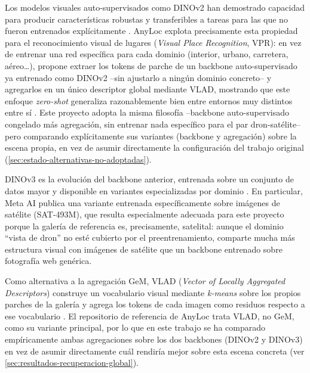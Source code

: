 Los modelos visuales auto-supervisados como DINOv2 han demostrado capacidad para producir características robustas y transferibles a tareas para las que no fueron entrenados explícitamente \parencite{oquab2023dinov2}. AnyLoc explota precisamente esta propiedad para el reconocimiento visual de lugares (\textit{Visual Place Recognition}, VPR): en vez de entrenar una red específica para cada dominio (interior, urbano, carretera, aéreo\ldots), propone extraer los tokens de parche de un backbone auto-supervisado ya entrenado como DINOv2 --sin ajustarlo a ningún dominio concreto-- y agregarlos en un único descriptor global mediante VLAD, mostrando que este enfoque \textit{zero-shot} generaliza razonablemente bien entre entornos muy distintos entre sí \parencite{keetha2023anyloc}. Este proyecto adopta la misma filosofía --backbone auto-supervisado congelado más agregación, sin entrenar nada específico para el par dron-satélite-- pero comparando explícitamente sus variantes (backbone y agregación) sobre la escena propia, en vez de asumir directamente la configuración del trabajo original (\autoref{sec:estado-alternativas-no-adoptadas}).

DINOv3 es la evolución del backbone anterior, entrenada sobre un conjunto de datos mayor y disponible en variantes especializadas por dominio \parencite{simeoni2025dinov3}. En particular, Meta AI publica una variante entrenada específicamente sobre imágenes de satélite (SAT-493M), que resulta especialmente adecuada para este proyecto porque la galería de referencia es, precisamente, satelital: aunque el dominio \enquote{vista de dron} no esté cubierto por el preentrenamiento, comparte mucha más estructura visual con imágenes de satélite que un backbone entrenado sobre fotografía web genérica.

Como alternativa a la agregación GeM, VLAD (\textit{Vector of Locally Aggregated Descriptors}) construye un vocabulario visual mediante \textit{k-means} sobre los propios parches de la galería y agrega los tokens de cada imagen como residuos respecto a ese vocabulario \parencite{arandjelovic2016netvlad}. El repositorio de referencia de AnyLoc trata VLAD, no GeM, como su variante principal, por lo que en este trabajo se ha comparado empíricamente ambas agregaciones sobre los dos backbones (DINOv2 y DINOv3) en vez de asumir directamente cuál rendiría mejor sobre esta escena concreta (ver \autoref{sec:resultados-recuperacion-global}).


